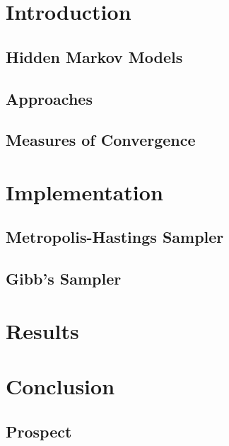 
\chapter{Introduction}
	\section{Hidden Markov Models}
		
		
	\section{Approaches}
		
		
	\section{Measures of Convergence}
		

\chapter{Implementation}
	\section{Metropolis-Hastings Sampler}
		
	\section{Gibb's Sampler}
		

\chapter{Results}
	

\chapter{Conclusion}
\section{Prospect}